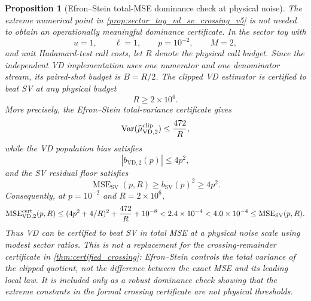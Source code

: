 \documentclass[11pt]{article}
\newtheorem{proposition}{Proposition}
\newcommand{\MSE}{\operatorname{MSE}}
\newcommand{\Var}{\operatorname{Var}}
\newcommand{\1}{\mathbf{1}}
\newcommand{\abs}[1]{\left\lvert #1 \right\rvert}
\begin{document}
\begin{proposition}[Efron--Stein total-MSE dominance check at physical noise]
\label{prop:sector_es_operational_certificate_v12}
The extreme numerical point in \cref{prop:sector_toy_vd_sv_crossing_v5} is not needed to obtain an operationally meaningful dominance certificate.  In the sector toy with
\begin{equation}
    u=1,\qquad \ell=1,\qquad p=10^{-2},\qquad M=2,
\end{equation}
and unit Hadamard-test call costs, let \(R\) denote the physical call budget.  Since the independent VD implementation uses one numerator and one denominator stream, its paired-shot budget is \(B=R/2\).  The clipped VD estimator is certified to beat SV at any physical budget
\begin{equation}
    R\ge 2\times10^6.
    \label{eq:sector_es_budget_v12}
\end{equation}
More precisely, the Efron--Stein total-variance certificate gives
\begin{equation}
    \Var(\widehat\mu_{\mathrm{VD},2}^{\rm clip})
    \le \frac{472}{R},
    \label{eq:sector_es_236_v12}
\end{equation}
while the VD population bias satisfies
\begin{equation}
    \abs{b_{\mathrm{VD},2}(p)}\le 4p^2,
    \label{eq:sector_es_bvd_v12}
\end{equation}
and the SV residual floor satisfies
\begin{equation}
    \MSE_{\mathrm{SV}}(p,R)\ge b_{\mathrm{SV}}(p)^2\ge 4p^2.
    \label{eq:sector_es_sv_floor_v12}
\end{equation}
Consequently, at \(p=10^{-2}\) and \(R=2\times10^6\),
\begin{equation}
    \MSE_{\mathrm{VD},2}^{\rm cert}(p,R)
    \le (4p^2+4/R)^2+\frac{472}{R}+10^{-8}
    <2.4\times10^{-4}
    <4.0\times10^{-4}
    \le \MSE_{\mathrm{SV}}(p,R).
    \label{eq:sector_es_numeric_v12}
\end{equation}
Thus VD can be certified to beat SV in total MSE at a physical noise scale using modest sector ratios.  This is not a replacement for the crossing-remainder certificate in \cref{thm:certified_crossing}: Efron--Stein controls the total variance of the clipped quotient, not the difference between the exact MSE and its leading local law.  It is included only as a robust dominance check showing that the extreme constants in the formal crossing certificate are not physical thresholds.
\end{proposition}
\end{document}
